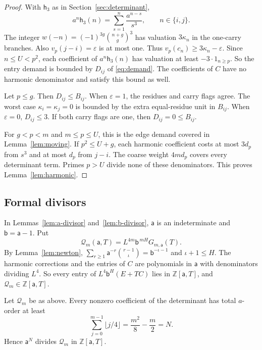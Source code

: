 \begin{proof}
With \(\mathsf h_3\) as in Section~\ref{sec:determinant},
\[
 a^n\mathsf h_3(n)=\sum_{s=1}^n\frac{a^{n-s}}{s^3},\qquad n\in\{i,j\}.
\]
The integer \(w(-n)=(-1)^{3g}\binom{n+g}{g}^3\) has valuation \(3 \kappa_n\) in the one-carry branches. Also \(v_p(j-i)=\varepsilon\) is at most one. Thus \(v_p(c_n)\ge3 \kappa_n-\varepsilon\). Since \(n\le{}U<p^2\), each coefficient of \(a^n\mathsf h_3(n)\) has valuation at least \(-3\cdot1_{n\ge{}p}\). So the entry demand is bounded by \(D_{ij}\) of \eqref{eq:demand}. The coefficients of \(C\) have no harmonic denominator and satisfy this bound as well.

Let \(p\le{}g\). Then \(D_{ij}\le{}B_{ij}\). When \(\varepsilon=1\), the residues and carry flags agree. The worst case \(\kappa_i=\kappa_j=0\) is bounded by the extra equal-residue unit in \(B_{ij}\). When \(\varepsilon=0\), \(D_{ij}\le3\). If both carry flags are one, then \(D_{ij}=0\le{}B_{ij}\).

For \(g<p<m\) and \(m\le{}p\le{}U\), this is the edge demand covered in Lemma~\ref{lem:moving}. If \(p^2\le{}U+g\), each harmonic coefficient costs at most \(3d_p\) from \(s^3\) and at most \(d_p\) from \(j-i\). The coarse weight \(4m d_p\) covers every determinant term. Primes \(p>U\) divide none of these denominators. This proves Lemma~\ref{lem:harmonic}.
\end{proof}

\subsection{Formal divisors}\label{subsec:coefficientwise}

In Lemmas~\ref{lem:a-divisor} and~\ref{lem:b-divisor}, \(\mathsf a\) is an indeterminate and \(\mathsf b=\mathsf a-1\). Put
\[
 \mathcal Q_m(\mathsf a,T)=L^{4m}\mathsf b^{\,mH}G_{m,\mathsf a}(T).
\]
By Lemma~\ref{lem:newton}, \(\sum_{r\ge1}\mathsf a^{-r}\binom{r-1}{\iota}=\mathsf b^{-\iota-1}\) and \(\iota+1\le H\). The harmonic corrections and the entries of \(C\) are polynomials in \(\mathsf a\) with denominators dividing \(L^4\). So every entry of \(L^4\mathsf b^H(E+TC)\) lies in \(\mathbb Z[\mathsf a,T]\), and \(\mathcal Q_m\in\mathbb Z[\mathsf a,T]\).

\begin{lemma}\label{lem:a-divisor}
Let \(\mathcal Q_m\) be as above. Every nonzero coefficient of the determinant has total \(a\)-order at least
\[
 \sum_{j=0}^{m-1}\lfloor j/4\rfloor
 =\frac{m^2}8-\frac m2=N.
\]
Hence \(\mathsf a^N\) divides \(\mathcal Q_m\) in \(\mathbb Z[\mathsf a,T]\).
\end{lemma}


